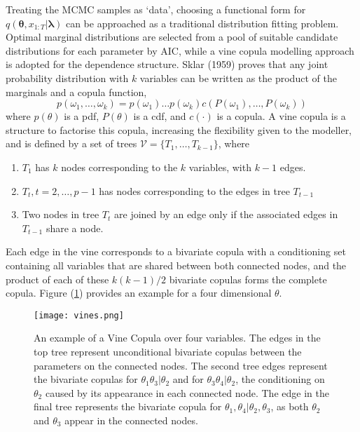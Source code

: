 \documentclass[12pt,a4paper]{article}%
\numberwithin{equation}{section}
\begin{document}
{{Treating the MCMC samples as `data', choosing a functional form for $q(\boldsymbol{\theta}, x_{1:T} | \boldsymbol{\lambda})$ can be approached as a traditional distribution fitting problem. Optimal marginal distributions are selected from a pool of suitable candidate distributions for each parameter by AIC, while a vine copula modelling approach is adopted for the dependence structure. Sklar (1959) proves that any joint probability distribution with $k$ variables can be written as the product of the marginals and a copula function,
\begin{equation}
\label{vc1}
p(\omega_1, \dots, \omega_k) = p(\omega_1) \dots p(\omega_k) c(P(\omega_1), \dots, P(\omega_k))
\end{equation}
where $p(\theta)$ is a pdf, $P(\theta)$ is a cdf, and $c(\cdot)$ is a copula. A vine copula is a structure to factorise this copula, increasing the flexibility given to the modeller, and is defined by a set of trees $\mathcal{V} = \{T_1, \dots, T_{k-1} \}$, where
\begin{enumerate}
\item $T_1$ has $k$ nodes corresponding to the $k$ variables, with $k-1$ edges.
\item $T_t, t = 2, \dots, p-1$ has nodes corresponding to the edges in tree $T_{t-1}$
\item Two nodes in tree $T_t$ are joined by an edge only if the associated edges in $T_{t-1}$ share a node. 
\end{enumerate}
Each edge in the vine corresponds to a bivariate copula with a conditioning set containing all variables that are shared between both connected nodes, and the product of each of these $k(k-1)/2$ bivariate copulas forms the complete copula. Figure (\ref{fig:vinecop}) provides an example for a four dimensional $\theta$.
\begin{figure}[h]
\centering
\texttt{[image: vines.png]}
\vspace{2mm}
\caption{An example of a Vine Copula over four variables. The edges in the top tree represent unconditional bivariate copulas between the parameters on the connected nodes. The second tree edges represent the bivariate copulas for $\theta_1 \theta_3 | \theta_2$ and for $\theta_3 \theta_4 | \theta_2$, the conditioning on $\theta_2$ caused by its appearance in each connected node. The edge in the final tree represents the bivariate copula for $\theta_1, \theta_4 | \theta_2, \theta_3$, as both $\theta_2$ and $\theta_3$ appear in the connected nodes.}
\label{fig:vinecop}
\end{figure}

}}
\end{document}
